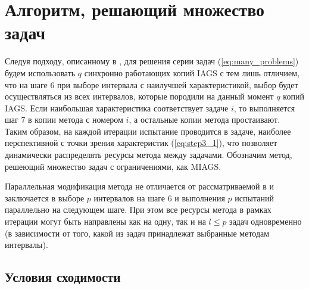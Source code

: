 \section{Алгоритм, решающий множество задач}





Следуя подходу, описанному в \cite{BarkalovStrongin2018}, для решения серии задач (\ref{eq:many_problems}) будем
использовать \(q\) синхронно работающих копий IAGS с тем лишь отличием, что на шаге 6 при выборе
интервала с наилучшей характеристикой, выбор будет осуществляться из всех интервалов, которые
породили на данный момент \(q\) копий IAGS. Если наибольшая характеристика соответствует
задаче \(i\), то выполняется шаг 7 в копии метода с номером \(i\), а остальные копии метода простаивают.
Таким образом, на каждой итерации испытание проводится в задаче, наиболее перспективной с точки зрения
характеристик (\ref{eq:step3_1}), что позволяет динамически распределять ресурсы метода между задачами.
Обозначим метод, решеющий множество задач с ограничениями, как MIAGS.

Параллельная модификация метода не отличается от рассматриваемой в \cite{BarkalovStrongin2018}
и заключается в выборе \(p\) интервалов на шаге 6 и выполнения \(p\) испытаний параллельно
на следующем шаге. При этом все ресурсы метода в рамках итерации могут быть направлены как на одну, так и
на \(l\leqslant p\) задач одновременно (в зависимости от того, какой из задач принадлежат выбранные методам интервалы).

\subsection{Условия сходимости}
\label{sec:conv_method}

